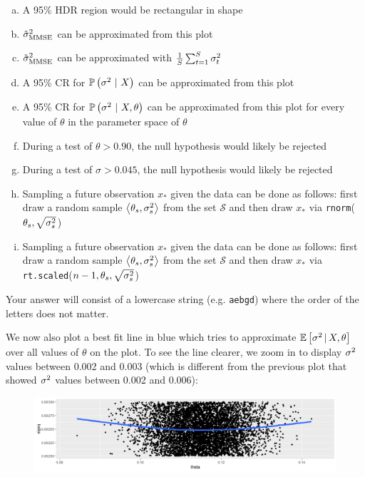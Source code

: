 \documentclass[12pt,landscape]{article}
\newcommand{\instr}{\small Your answer will consist of a lowercase string (e.g. \texttt{aebgd}) where the order of the letters does not matter. \normalsize}
\begin{document}
\begin{enumerate}[(a)]
\item A 95\% HDR region would be rectangular in shape
\item $\hat{\sigma}^2_{\text{MMSE}}$ can be approximated from this plot
\item $\hat{\sigma}^2_{\text{MMSE}}$ can be approximated with $\frac{1}{S} \sum_{t=1}^S \sigma^2_t$
\item A 95\% CR for $\mathbb{P}\left(\sigma^2~|~X\right)$ can be approximated from this plot
\item A 95\% CR for $\mathbb{P}\left(\sigma^2~|~X, \theta\right)$ can be approximated from this plot for every value of $\theta$ in the parameter space of $\theta$
\item During a test of $\theta > 0.90$, the null hypothesis would likely be rejected
\item During a test of $\sigma > 0.045$, the null hypothesis would likely be rejected
\item Sampling a future observation $x_*$ given the data can be done as follows: first draw a random sample $\left<\theta_s, \sigma^2_s\right>$ from the set $\mathcal{S}$ and then draw $x_*$ via \texttt{rnorm}($\theta_s, \sqrt{\sigma^2_s}$)
\item Sampling a future observation $x_*$ given the data can be done as follows: first draw a random sample $\left<\theta_s, \sigma^2_s\right>$ from the set $\mathcal{S}$ and then draw $x_*$ via \texttt{rt.scaled}($n-1,\theta_s, \sqrt{\sigma^2_s}$)
\end{enumerate}
\eenum\instr\pagebreak



\problem{}  We now also plot a best fit line in blue which tries to approximate $\mathbb{E}\left[\sigma^2\,|\,X, \theta\right]$ over all values of $\theta$ on the plot. To see the line clearer, we zoom in to display $\sigma^2$ values between 0.002 and 0.003 (which is different from the previous plot that showed $\sigma^2$ values between 0.002 and 0.006):



\vspace{-0.3cm}
\begin{figure}[h]
\centering
\includegraphics[width=8in]{best_fit_line.png}
\end{figure}
\end{document}
